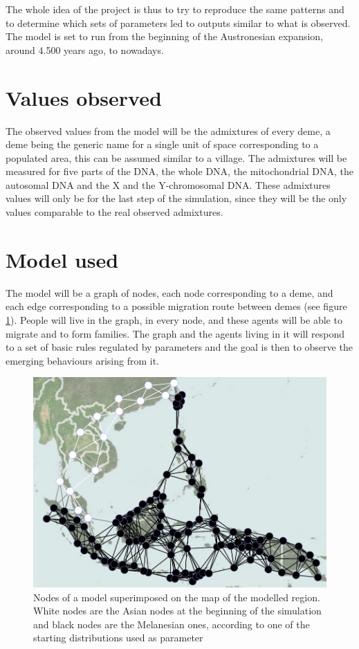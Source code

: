 \documentclass[a4paper,12pt]{report}
\begin{document}
The whole idea of the project is thus to try to reproduce the same patterns and to determine which sets of parameters led to outputs similar to what is observed. The model is set to run from the beginning of the Austronesian expansion, around 4.500 years ago, to nowadays.

\section{Values observed}
The observed values from the model will be the admixtures of every deme, a deme being the generic name for a single unit of space corresponding to a populated area, this can be assumed similar to a village. The admixtures will be measured for five parts of the DNA, the whole DNA, the mitochondrial DNA, the autosomal DNA and the X and the Y-chromosomal DNA. These admixtures values will only be for the last step of the simulation, since they will be the only values comparable to the real observed admixtures.

\section{Model used}
The model will be a graph of nodes, each node corresponding to a deme, and each edge corresponding to a possible migration route between demes (see figure \ref{nodesOnMap}). People will live in the graph, in every node, and these agents will be able to migrate and to form families. The graph and the agents living in it will respond to a set of basic rules regulated by parameters and the goal is then to observe the emerging behaviours arising from it.

\begin{figure}[!ht]
	\centering
	\includegraphics[width=1\textwidth]{../data/ISEA-node-map.png}
	\caption{Nodes of a model superimposed on the map of the modelled region. White nodes are the Asian nodes at the beginning of the simulation and black nodes are the Melanesian ones, according to one of the starting distributions used as parameter}
	\label{nodesOnMap}
\end{figure}
\end{document}
